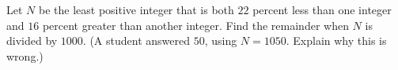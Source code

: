Let $N$ be the least positive integer that is both $22$ percent less than one integer and $16$ percent greater than another integer. Find the remainder when $N$ is divided by $1000$. (A student answered $50$, using $N=1050$. Explain why this is wrong.)
